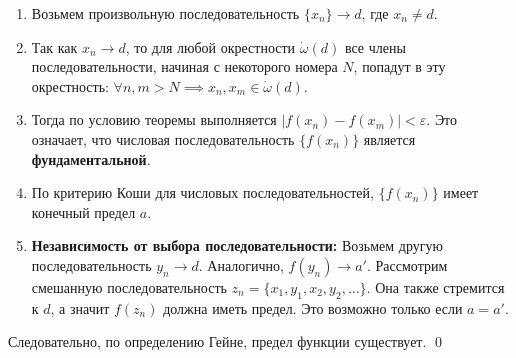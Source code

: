 \documentclass[a4paper,12pt]{article}
\begin{document}
	\begin{enumerate}
		\item Возьмем произвольную последовательность $\{x_n\} \to d$, где $x_n \neq d$.
		\item Так как $x_n \to d$, то для любой окрестности $\dot{\omega}(d)$ все члены последовательности, начиная с некоторого номера $N$, попадут в эту окрестность: $\forall n, m > N \implies x_n, x_m \in \dot{\omega}(d)$.
		\item Тогда по условию теоремы выполняется $|f(x_n) - f(x_m)| < \varepsilon$. Это означает, что числовая последовательность $\{f(x_n)\}$ является \textbf{фундаментальной}.
		\item По критерию Коши для числовых последовательностей, $\{f(x_n)\}$ имеет конечный предел $a$.
		\item \textbf{Независимость от выбора последовательности:} Возьмем другую последовательность $y_n \to d$. Аналогично, $f(y_n) \to a'$. Рассмотрим смешанную последовательность $z_n = \{x_1, y_1, x_2, y_2, \dots\}$. Она также стремится к $d$, а значит $f(z_n)$ должна иметь предел. Это возможно только если $a = a'$.
	\end{enumerate}
	Следовательно, по определению Гейне, предел функции существует. \qed
	
\end{document}
